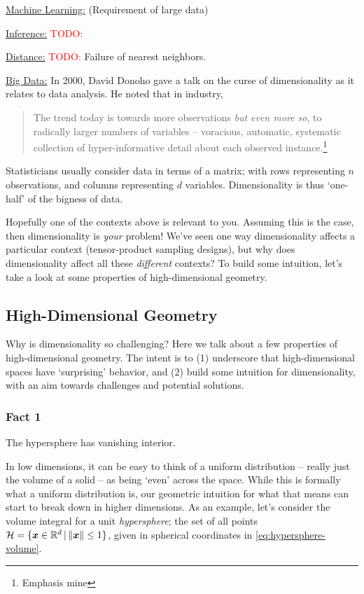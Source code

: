 \documentclass{article}
\begin{document}
\bigskip\noindent\underline{Machine Learning:} (Requirement of large data)

\bigskip\noindent\underline{Inference:} \textcolor{red}{TODO:}

\bigskip\noindent\underline{Distance:} \textcolor{red}{TODO:} Failure
of nearest neighbors.

\bigskip\noindent\underline{Big Data:} In 2000, David Donoho gave a talk on the
curse of dimensionality as it relates to data analysis.\cite{donoho2000high}
He noted that in industry,

\begin{quote}
  The trend today is towards more observations \emph{but even more so},
  \textcolor{palered}{to radically larger numbers of variables} – voracious,
  automatic, systematic collection of hyper-informative detail about each
  observed instance.\footnote{Emphasis mine}
\end{quote}

Statisticians usually consider data in terms of a matrix; with rows representing
$n$ observations, and columns representing $d$ variables. Dimensionality is thus
`one-half' of the bigness of data.

Hopefully one of the contexts above is relevant to you. Assuming this is the
case, then dimensionality is \emph{your} problem! We've seen one way
dimensionality affects a particular context (tensor-product sampling designs),
but why does dimensionality affect all these \emph{different} contexts? To build
some intuition, let's take a look at some properties of high-dimensional
geometry.

\subsection{High-Dimensional Geometry}
Why is dimensionality so challenging? Here we talk about a few properties of
high-dimensional geometry. The intent is to (1) underscore that high-dimensional
spaces have `surprising' behavior, and (2) build some intuition for
dimensionality, with an aim towards challenges and potential solutions.

\subsubsection{Fact 1}
The hypersphere has vanishing interior.

\bigskip
In low dimensions, it can be easy to think of a uniform distribution -- really
just the volume of a solid -- as being `even' across the space. While this is
formally what a uniform distribution is, our geometric intuition for what that
means can start to break down in higher dimensions. As an example, let's
consider the volume integral for a unit \emph{hypersphere}; the set of all
points $\mathcal{H}=\{\boldsymbol{x}\in\mathbb{R}^{d}\,|\,\|\boldsymbol{x}\|\leq 1\}$, given in spherical coordinates
in \eqref{eq:hypersphere-volume}.
\end{document}
